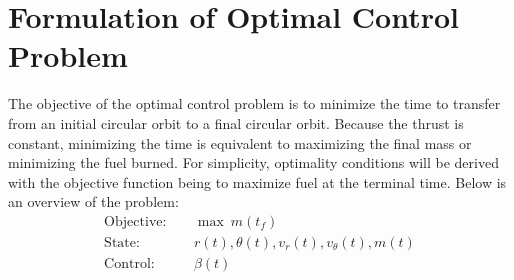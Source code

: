 \documentclass[]{article}
\begin{document}
\section{Formulation of Optimal Control Problem}
The objective of the optimal control problem is to minimize the time to transfer from an initial circular orbit to a final circular orbit. Because the thrust is constant, minimizing the time is equivalent to maximizing the final mass or minimizing the fuel burned. For simplicity, optimality conditions will be derived with the objective function being to maximize fuel at the terminal time. Below is an overview of the problem:
\begin{align*}
\mathrm{Objective}:& \quad \max\ m(t_f) \\
\mathrm{State}:&     \quad r(t), \theta(t), v_r(t), v_\theta(t), m(t) \\
\mathrm{Control}:&   \quad \beta(t)
\end{align*}
\end{document}
